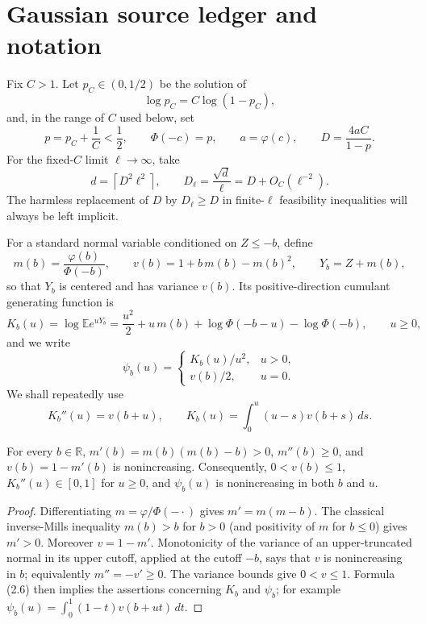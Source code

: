\section{Gaussian source ledger and notation}\label{sec:setup}

Fix \(C>1\).  Let \(p_C\in(0,1/2)\) be the solution of
\[
 \log p_C=C\log(1-p_C),
\]
and, in the range of \(C\) used below, set
\[
 p=p_C+\frac1C<\frac12,\qquad
 \Phi(-c)=p,\qquad a=\varphi(c),\qquad
 D=\frac{4aC}{1-p}.
\tag{2.1}
\]
For the fixed-\(C\) limit \(\ell\to\infty\), take
\[
 d=\left\lceil D^2\ell^2\right\rceil,\qquad
 D_\ell=\frac{\sqrt d}{\ell}=D+O_C(\ell^{-2}).
\tag{2.2}
\]
The harmless replacement of \(D\) by \(D_\ell\ge D\) in finite-\(\ell\)
feasibility inequalities will always be left implicit.

For a standard normal variable conditioned on \(Z\le-b\), define
\[
 m(b)=\frac{\varphi(b)}{\Phi(-b)},\qquad
 v(b)=1+b\,m(b)-m(b)^2,\qquad Y_b=Z+m(b),
\tag{2.3}
\]
so that \(Y_b\) is centered and has variance \(v(b)\).  Its
positive-direction cumulant generating function is
\[
 K_b(u)=\log\mathbb E e^{uY_b}
 =\frac{u^2}{2}+u\,m(b)+\log\Phi(-b-u)-\log\Phi(-b),
 \qquad u\ge0,
\tag{2.4}
\]
and we write
\[
 \psi_b(u)=
 \begin{cases}K_b(u)/u^2,&u>0,\\[1mm]v(b)/2,&u=0.
 \end{cases}
\tag{2.5}
\]
We shall repeatedly use
\[
 K_b''(u)=v(b+u),\qquad
 K_b(u)=\int_0^u(u-s)v(b+s)\,ds.
\tag{2.6}
\]

\begin{lemma}\label{lem:mills}
For every \(b\in\mathbb R\), \(m'(b)=m(b)(m(b)-b)>0\),
\(m''(b)\ge0\), and \(v(b)=1-m'(b)\) is nonincreasing.  Consequently,
\(0<v(b)\le1\), \(K_b''(u)\in[0,1]\) for \(u\ge0\), and
\(\psi_b(u)\) is nonincreasing in both \(b\) and \(u\).
\end{lemma}

\begin{proof}
Differentiating \(m=\varphi/\Phi(-\cdot)\) gives
\(m'=m(m-b)\).  The classical inverse-Mills inequality \(m(b)>b\) for
\(b>0\) (and positivity of \(m\) for \(b\le0\)) gives \(m'>0\).
Moreover \(v=1-m'\).  Monotonicity of the variance of an upper-truncated
normal in its upper cutoff, applied at the cutoff \(-b\), says that \(v\) is
nonincreasing in \(b\); equivalently \(m''=-v'\ge0\).  The variance bounds
give \(0<v\le1\).  Formula (2.6) then implies the assertions concerning
\(K_b\) and \(\psi_b\); for example
\(\psi_b(u)=\int_0^1(1-t)v(b+ut)\,dt\).
\end{proof}

